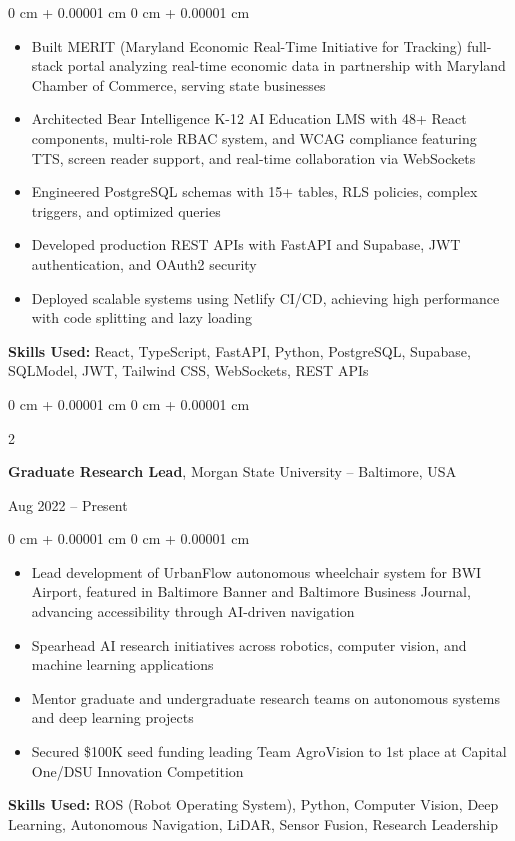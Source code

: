 \documentclass[10pt, letterpaper]{article}
\newenvironment{highlights}{
    \begin{itemize}[
        topsep=0.10 cm,
        parsep=0.10 cm,
        partopsep=0pt,
        itemsep=0pt,
        leftmargin=0 cm + 10pt
    ]
}{
    \end{itemize}
} %
\newenvironment{onecolentry}{
    \begin{adjustwidth}{
        0 cm + 0.00001 cm
    }{
        0 cm + 0.00001 cm
    }
}{
    \end{adjustwidth}
} %
\newenvironment{twocolentry}[2][]{
    \onecolentry
    \def\secondColumn{#2}
    \setcolumnwidth{\fill, 4.5 cm}
    \begin{paracol}{2}
}{
    \switchcolumn \raggedleft \secondColumn
    \end{paracol}
    \endonecolentry
} %
\begin{document}
    \vspace{0.10 cm}
    \begin{onecolentry}
        \begin{highlights}
            \item Built MERIT (Maryland Economic Real-Time Initiative for Tracking) full-stack portal analyzing real-time economic data in partnership with Maryland Chamber of Commerce, serving state businesses
            \item Architected Bear Intelligence K-12 AI Education LMS with 48+ React components, multi-role RBAC system, and WCAG compliance featuring TTS, screen reader support, and real-time collaboration via WebSockets
            \item Engineered PostgreSQL schemas with 15+ tables, RLS policies, complex triggers, and optimized queries
            \item Developed production REST APIs with FastAPI and Supabase, JWT authentication, and OAuth2 security
            \item Deployed scalable systems using Netlify CI/CD, achieving high performance with code splitting and lazy loading
        \end{highlights}
        \vspace{0.05 cm}
        \textbf{Skills Used:} React, TypeScript, FastAPI, Python, PostgreSQL, Supabase, SQLModel, JWT, Tailwind CSS, WebSockets, REST APIs
    \end{onecolentry}

    \vspace{0.25 cm}

    \begin{twocolentry}{
        Aug 2022 – Present
    }
        \textbf{Graduate Research Lead}, Morgan State University -- Baltimore, USA
    \end{twocolentry}

    \vspace{0.10 cm}
    \begin{onecolentry}
        \begin{highlights}
            \item Lead development of UrbanFlow autonomous wheelchair system for BWI Airport, featured in Baltimore Banner and Baltimore Business Journal, advancing accessibility through AI-driven navigation
            \item Spearhead AI research initiatives across robotics, computer vision, and machine learning applications
            \item Mentor graduate and undergraduate research teams on autonomous systems and deep learning projects
            \item Secured \$100K seed funding leading Team AgroVision to 1st place at Capital One/DSU Innovation Competition
        \end{highlights}
        \vspace{0.05 cm}
        \textbf{Skills Used:} ROS (Robot Operating System), Python, Computer Vision, Deep Learning, Autonomous Navigation, LiDAR, Sensor Fusion, Research Leadership
    \end{onecolentry}
\end{document}
